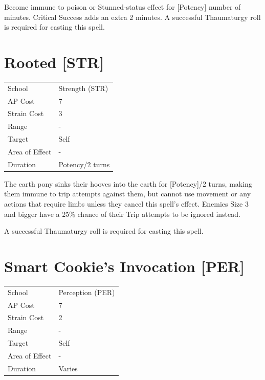 \documentclass[11pt,a4paper,twocolumn]{book}
\begin{document}
\medskip

Become immune to poison or Stunned-status effect for [Potency] number of minutes. Critical Success adds an extra 2 minutes. A successful Thaumaturgy roll is required for casting this spell.


\section*{Rooted [STR]}
{
	\begin{tabu} to 75mm{| X[l,4] | X[l,7] |}
		\hline
		School 			& Strength (STR) 	\\
        AP Cost	      	& 7 				\\
        Strain Cost     & 3 				\\
        Range     		& - 				\\
        Target      	& Self 				\\
        Area of Effect  & - 	 			\\
        Duration     	& Potency/2 turns 	\\ \hline
	\end{tabu}
		
}

\medskip

The earth pony sinks their hooves into the earth for [Potency]/2 turns, making them immune to trip attempts against them, but cannot use movement or any actions that require limbs unless they cancel this spell's effect. Enemies Size 3 and bigger have a 25\% chance of their Trip attempts to be ignored instead.

A successful Thaumaturgy roll is required for casting this spell.

\vfill


\section*{Smart Cookie's Invocation [PER]}
{
	\begin{tabu} to 75mm{| X[l,4] | X[l,7] |}
		\hline
		School 			& Perception (PER) 	\\
        AP Cost	      	& 7 				\\
        Strain Cost     & 2 				\\
        Range     		& - 				\\
        Target      	& Self 				\\
        Area of Effect  & - 	 			\\
        Duration     	& Varies 			\\ \hline
	\end{tabu}
		
}
\end{document}
